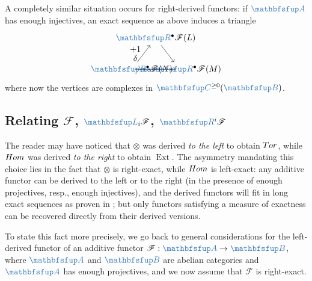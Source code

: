 A completely similar situation occurs for right-derived functors: if
$\categ{A}$ has enough injectives, an exact sequence as above induces
a triangle
\[
  \begin{tikzpicture}[baseline=(current bounding box.center)]
    \node (L) at (1,1.3)
    {$\categ{R}^\bullet\mathscr{F}(L)$}; \node (N) at (0,0)
    {$\categ{R}^\bullet\mathscr{F}(N)$}; \node (M) at (2,0)
    {$\categ{R}^\bullet\mathscr{F}(M)$}; \draw[->] (L) -- (M);
    \draw[->] (M) -- (N); \draw[->] (N) -- (L) node[midway, left]
    {$\shortstack{$+1$ \\ $\delta$}$};
  \end{tikzpicture}
\]
where now the vertices are complexes in
$\categ{C}^{\ge 0}(\categ{B})$.

\subsection{\texorpdfstring{Relating $\mathscr{F}$,
    $\categ{L}_i\mathscr{F}$, $\categ{R}^i\mathscr{F}$}{Relating F,
    LiF, RiF}}
\label{subsec:homol:relating-f-li-f-rif}

The reader may have noticed that $\otimes$ was derived \emph{to the
  left} to obtain $Tor$, while $Hom$ was derived \emph{to the right}
to obtain $\operatorname{Ext}$. The asymmetry mandating this choice
lies in the fact that $\otimes$ is right-exact, while $Hom$ is
left-exact: any additive functor can be derived to the left or to the
right (in the presence of enough projectives, resp., enough
injectives), and the derived functors will fit in long exact sequences
as proven in ; but only functors
satisfying a measure of exactness can be recovered directly from their
derived versions.

To state this fact more precisely, we go back to general
considerations for the left-derived functor of an additive functor
$\mathscr{F} : \categ{A} \to \categ{B}$, where $\categ{A}$ and
$\categ{B}$ are abelian categories and $\categ{A}$ has enough
projectives, and we now assume that $\mathscr{F}$ is right-exact.

